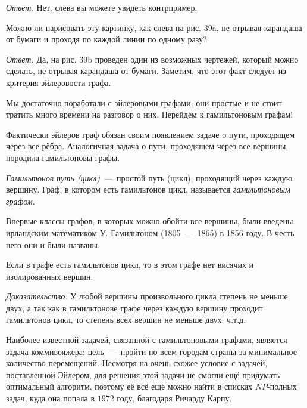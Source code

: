 \begin{paracol}{2}
\begin{example}
	\emph{Ответ.} Нет, слева вы можете увидеть контрпример.
\end{example}	 

\vskip 1.2cm

\begin{example}
	Можно ли нарисовать эту картинку, как слева на рис. 39a, не отрывая карандаша от бумаги и проходя по каждой линии по одному разу?
	
	\emph{Ответ.} Да, на рис. 39b проведен один из возможных чертежей, который можно сделать, не отрывая карандаша от бумаги. Заметим, что этот факт следует из критерия эйлеровости графа.
\end{example}
\end{paracol}

	Мы достаточно поработали с эйлеровыми графами: они простые и не стоит тратить много времени на разговор о них. Перейдем к гамильтоновым графам!


	Фактически эйлеров граф обязан своим появлением задаче о пути, проходящем через все рёбра. Аналогичная задача о пути, проходящем через все вершины, породила гамильтоновы графы.
	
\begin{definition}
	\emph{Гамильтонов путь (цикл)}~---~простой путь (цикл), проходящий через каждую вершину. Граф, в котором есть гамильтонов цикл, называется \emph{гамильтоновым графом}.
\end{definition}

	Впервые классы графов, в которых можно обойти все вершины, были введены ирландским математиком У. Гамильтоном (1805~---~1865) в 1856 году. В честь него они и были названы.
	
\begin{statement}
	Если в графе есть гамильтонов цикл, то в этом графе нет висячих и изолированных вершин.
	
	\emph{Доказательство.} У любой вершины произвольного цикла степень не меньше двух, а так как в гамильтонове графе через каждую вершину проходит гамильтонов цикл, то степень всех вершин не меньше двух. ч.т.д.
\end{statement}

	Наиболее известной задачей, связанной с гамильтоновыми графами, является задача коммивояжера: цель~---~пройти по всем городам страны за минимальное количество перемещений. Несмотря на очень схожее условие с задачей, поставленной Эйлером, для решения этой задачи не смогли ещё придумать оптимальный алгоритм, поэтому её всё ещё можно найти в списках $NP$-полных задач, куда она попала в $1972$ году, благодаря Ричарду Карпу.


